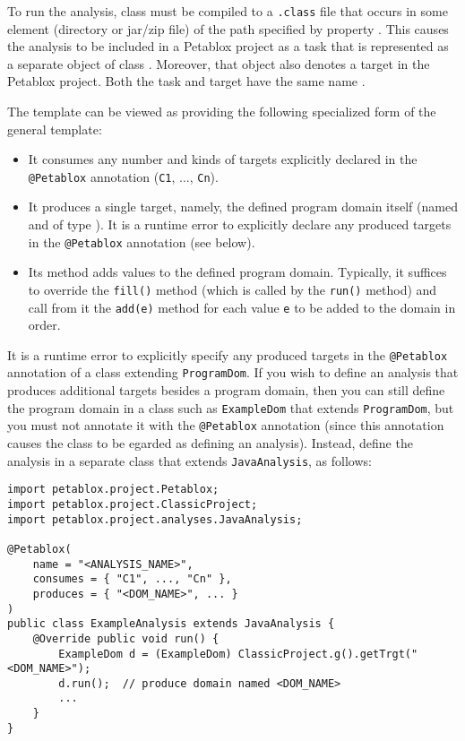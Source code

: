 To run the analysis, class  must be compiled to a {\tt .class}
file that occurs in some element (directory or jar/zip file) of the path
specified by property .  This causes the
analysis to be included in a Petablox project as a task that is represented as a
separate object of class .  Moreover, that object also denotes
a target in the Petablox project.  Both the task and target have the same name
.

The  template can be viewed as providing the following
specialized form of the general  template:

\begin{itemize}
\item
It consumes any number and kinds of targets explicitly declared in the 
{\tt @Petablox} annotation ({\tt C1}, ..., {\tt Cn}).
\item
It produces a single target, namely, the defined program domain itself
(named  and of type ).  It is a runtime error
to explicitly declare any produced targets in the {\tt @Petablox} annotation (see
below).
\item
Its  method adds values to the defined program domain.  Typically,
it suffices to override the {\tt fill()} method (which is called by the
{\tt run()} method) and call from it the {\tt add(e)} method for each value
{\tt e} to be added to the domain in order.
\end{itemize}

It is a runtime error to explicitly specify any produced targets in the
{\tt @Petablox} annotation of a class extending {\tt ProgramDom}.  If you wish to
define an analysis that produces additional targets besides a program domain,
then you can still define the program domain in a class such as
{\tt ExampleDom} that extends {\tt ProgramDom}, but you must not annotate it
with the {\tt @Petablox} annotation (since this annotation causes the class to be 
egarded as defining an analysis).  Instead, define the analysis in a separate
class that extends {\tt JavaAnalysis}, as follows:

\begin{framed}
\begin{verbatim}
import petablox.project.Petablox;
import petablox.project.ClassicProject;
import petablox.project.analyses.JavaAnalysis;

@Petablox(
    name = "<ANALYSIS_NAME>",
    consumes = { "C1", ..., "Cn" },
    produces = { "<DOM_NAME>", ... }
)
public class ExampleAnalysis extends JavaAnalysis {
    @Override public void run() {
        ExampleDom d = (ExampleDom) ClassicProject.g().getTrgt("<DOM_NAME>");
        d.run();  // produce domain named <DOM_NAME>
        ...
    }
}
\end{verbatim}
\end{framed}

